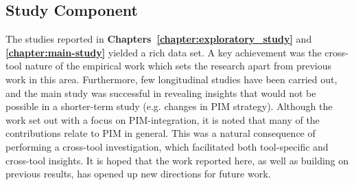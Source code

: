 \subsection{Study Component}
\label{disc:methodological-discussion:study}



The studies reported in \textbf{Chapters~\ref{chapter:exploratory_study}} and \textbf{\ref{chapter:main-study}} yielded a rich data set.  %
A key achievement was the cross-tool nature of the empirical work which sets the research apart from previous work in this area.  Furthermore, few longitudinal studies have been carried out, and the main study was successful in revealing insights that would not be possible in a shorter-term study (e.g. changes in PIM strategy).  Although the work set out with a focus on PIM-integration, it is noted that many of the contributions relate to PIM in general.  This was a natural consequence of performing a cross-tool investigation, which facilitated both tool-specific and cross-tool insights. It is hoped that the work reported here, as well as building on previous results, has opened up new directions for future work.

